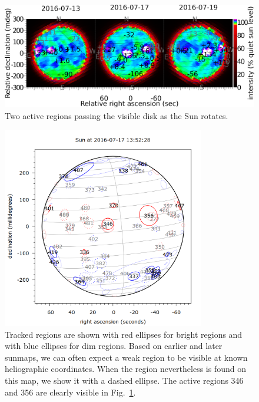 \documentclass{aa}
\begin{document}
\begin{figure}
\centering
\includegraphics[width=\textwidth]{maptrack1.png}
\caption{Two active regions passing the visible disk as the Sun rotates.}
\label{maptrack1}
\end{figure}

\begin{figure} \centering \includegraphics[width=8.8cm]{maptrack2.png} \caption{Tracked regions are shown with red 
ellipses for bright regions and with blue ellipses for dim regions. Based on earlier and later sunmaps, we can often 
expect a weak region to be visible at known heliographic coordinates. When the region nevertheless is found on this map, 
we show it with a dashed ellipse. The active regions 346 and 356 are clearly visible in Fig.~\ref{maptrack1}.} 
\label{maptrack2} \end{figure}


\end{document}
